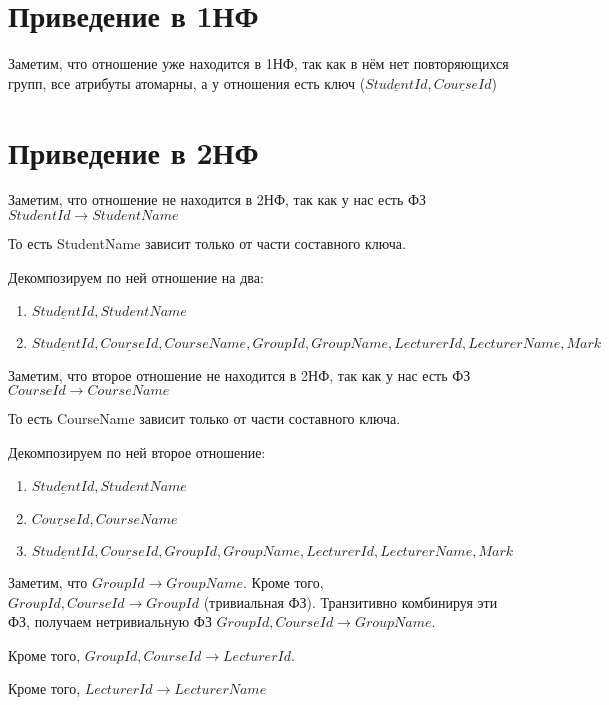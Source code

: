 \documentclass{article}
\begin{document}
	\section{Приведение в 1НФ}
	
	Заметим, что отношение уже находится в 1НФ, так как в нём нет повторяющихся групп, все атрибуты атомарны, а у отношения есть ключ ($\underline{StudentId}, \underline{CourseId}$)
	
	\section{Приведение в 2НФ}
	
	Заметим, что отношение не находится в 2НФ, так как у нас есть ФЗ $StudentId \rightarrow StudentName$
	
	То есть StudentName зависит только от части составного ключа.
	
	Декомпозируем по ней отношение на два:
	
	\begin{enumerate}
		\item $\underline{StudentId}, StudentName$
		\item $\underline{StudentId}, \underline{CourseId}, CourseName, GroupId, GroupName, LecturerId, LecturerName, Mark$
	\end{enumerate}
	
	Заметим, что второе отношение не находится в 2НФ, так как у нас есть ФЗ $CourseId \rightarrow CourseName$
	
	То есть CourseName зависит только от части составного ключа.
	
	Декомпозируем по ней второе отношение:
	
	\begin{enumerate}
		\item $\underline{StudentId}, StudentName$
		\item $\underline{CourseId}, CourseName$
		\item $\underline{StudentId}, \underline{CourseId}, GroupId, GroupName, LecturerId, LecturerName, Mark$
	\end{enumerate}

	Заметим, что  $GroupId \rightarrow GroupName$. Кроме того, $GroupId, CourseId \rightarrow GroupId$ (тривиальная ФЗ). Транзитивно комбинируя эти ФЗ, получаем нетривиальную ФЗ $GroupId, CourseId \rightarrow GroupName$.
	
	Кроме того, $GroupId, CourseId \rightarrow LecturerId$.
	
	Кроме того, $LecturerId \rightarrow LecturerName$
	
\end{document}
